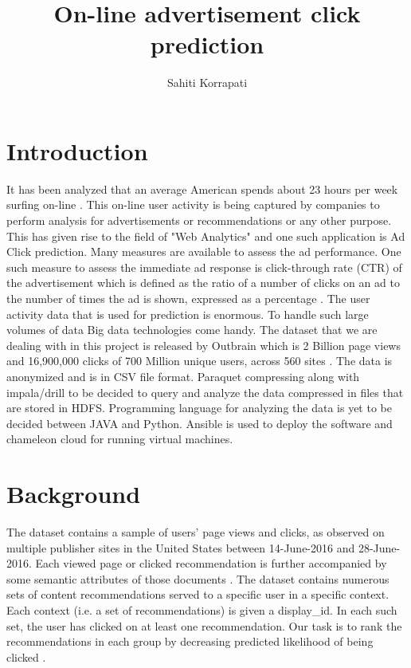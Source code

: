 \documentclass[9pt,twocolumn,twoside]{../../styles/osajnl}
\title{ On-line advertisement click prediction}
\author[1,*]{Sahiti Korrapati}
\affil[1]{School of Informatics and Computing, Bloomington, IN 47408, U.S.A.}
\affil[*]{Corresponding authors: sakorrap@iu.edu, S17-IR-2013}
\begin{document}
\maketitle

\section{Introduction}
It has been analyzed that an average American spends about 23 hours per week surfing on-line \cite{news-social-media}. This on-line user activity is being captured by companies to perform analysis for advertisements or recommendations or any other purpose. This has given rise to the field of "Web Analytics" and one such application is Ad Click prediction.
Many measures are available to assess the ad performance. One such measure to assess the immediate ad response is click-through rate (CTR) of the advertisement \cite{dictionary-clickThrough} which is defined as the ratio of a number of clicks on an ad to the number of times the ad is shown, expressed as a percentage \cite{wiki-clickThrough}.
The user activity data that is used for prediction is enormous. To handle such large volumes of data Big data technologies come handy. The dataset that we are dealing with in this project is released by Outbrain which is 2 Billion page views and 16,900,000 clicks of 700 Million unique users, across 560 sites \cite{kaggle-outbrain}. The data is anonymized and is in CSV file format. Paraquet compressing along with impala/drill to be decided to query and analyze the data compressed in files that are stored in HDFS. Programming language for analyzing the data is yet to be decided between JAVA and Python. Ansible is used to deploy the software and chameleon cloud for running virtual machines.

\section{Background}
The dataset contains a sample of users’ page views and clicks, as observed on multiple publisher sites in the United States between 14-June-2016 and 28-June-2016. Each viewed page or clicked recommendation is further accompanied by some semantic attributes of those documents \cite{kaggle-outbrain}.
The dataset contains numerous sets of content recommendations served to a specific user in a specific context. Each context (i.e. a set of recommendations) is given a display\_id. In each such set, the user has clicked on at least one recommendation. Our task is to rank the recommendations in each group by decreasing predicted likelihood of being clicked \cite{kaggle-outbrain}.
\end{document}
